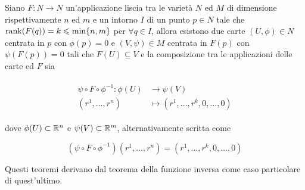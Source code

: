 \begin{theorem}
	Siano $ F : N \to N $ un'applicazione liscia tra le varietà $ N $ ed $ M $ di dimensione rispettivamente $ n $ ed $ m $ e un intorno $ I $ di un punto $ p \in N $ tale che $ \rank(F(q)) = k \leqslant \min\{n,m\} $ per $ \forall q \in I $, allora esistono due carte $ (U,\phi) \in N $ centrata in $ p $ con $ \phi(p)=0 $ e $ (V,\psi) \in M $ centrata in $ F(p) $ con $ \psi(F(p))=0 $ tali che $ F(U) \subseteq V $ e la composizione tra le applicazioni delle carte ed $ F $ sia
	
	\begin{align}
		\begin{split}
			\psi \circ F \circ \phi^{-1} : \phi(U) &\to \psi(V)\\
			(r^{1},\dots,r^{n}) &\mapsto (r^{1},\dots,r^{k},0,\dots,0)
		\end{split}
	\end{align}

	dove $ \phi(U) \subset \mathbb{R}^{n} $ e $ \psi(V) \subset \mathbb{R}^{m} $, alternativamente scritta come
	
	\begin{equation}
		(\psi \circ F \circ \phi^{-1})(r^{1},\dots,r^{n}) = (r^{1},\dots,r^{k},0,\dots,0)
	\end{equation}
\end{theorem}

Questi teoremi derivano dal teorema della funzione inversa come caso particolare di quest'ultimo.

